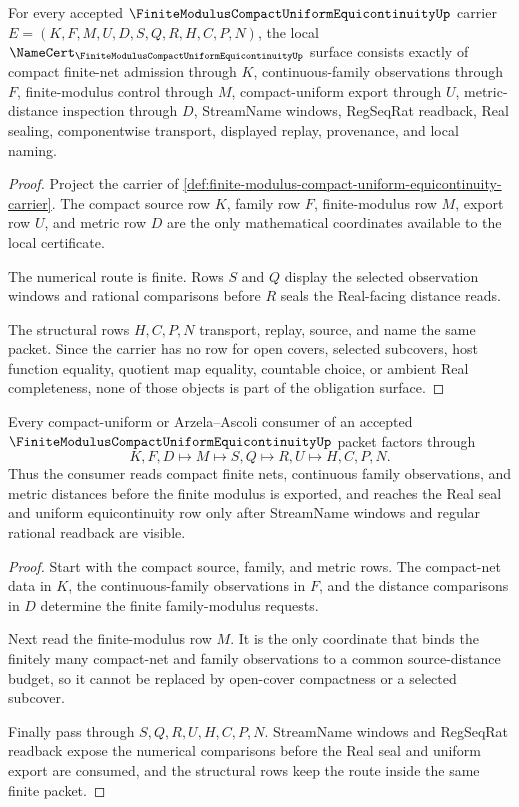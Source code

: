 \begin{theorem}
\label{thm:finite-modulus-compact-uniform-equicontinuity-namecert-obligations}
For every accepted $\FiniteModulusCompactUniformEquicontinuityUp$ carrier $E=(K,F,M,U,D,S,Q,R,H,C,P,N)$, the local $\NameCert_{\FiniteModulusCompactUniformEquicontinuityUp}$ surface consists exactly of compact finite-net admission through $K$, continuous-family observations through $F$, finite-modulus control through $M$, compact-uniform export through $U$, metric-distance inspection through $D$, StreamName windows, RegSeqRat readback, Real sealing, componentwise transport, displayed replay, provenance, and local naming.
\end{theorem}
\begin{proof}
Project the carrier of \autoref{def:finite-modulus-compact-uniform-equicontinuity-carrier}. The compact source row $K$, family row $F$, finite-modulus row $M$, export row $U$, and metric row $D$ are the only mathematical coordinates available to the local certificate.

The numerical route is finite. Rows $S$ and $Q$ display the selected observation windows and rational comparisons before $R$ seals the Real-facing distance reads.

The structural rows $H,C,P,N$ transport, replay, source, and name the same packet. Since the carrier has no row for open covers, selected subcovers, host function equality, quotient map equality, countable choice, or ambient Real completeness, none of those objects is part of the obligation surface.
\end{proof}

\begin{theorem}
\label{thm:finite-modulus-compact-uniform-equicontinuity-route}
Every compact-uniform or Arzela--Ascoli consumer of an accepted $\FiniteModulusCompactUniformEquicontinuityUp$ packet factors through
$$
K,F,D \longmapsto M \longmapsto S,Q \longmapsto R,U \longmapsto H,C,P,N .
$$
Thus the consumer reads compact finite nets, continuous family observations, and metric distances before the finite modulus is exported, and reaches the Real seal and uniform equicontinuity row only after StreamName windows and regular rational readback are visible.
\end{theorem}
\begin{proof}
Start with the compact source, family, and metric rows. The compact-net data in $K$, the continuous-family observations in $F$, and the distance comparisons in $D$ determine the finite family-modulus requests.

Next read the finite-modulus row $M$. It is the only coordinate that binds the finitely many compact-net and family observations to a common source-distance budget, so it cannot be replaced by open-cover compactness or a selected subcover.

Finally pass through $S,Q,R,U,H,C,P,N$. StreamName windows and RegSeqRat readback expose the numerical comparisons before the Real seal and uniform export are consumed, and the structural rows keep the route inside the same finite packet.
\end{proof}

